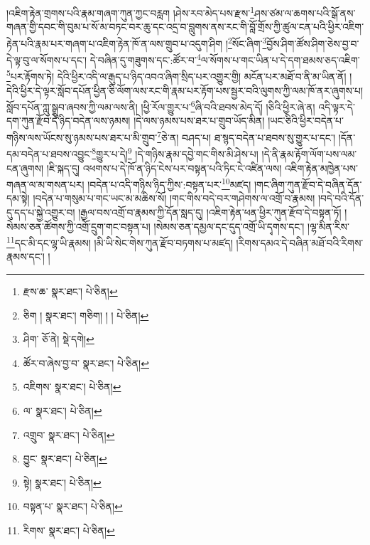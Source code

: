 །འཇིག་རྟེན་གྲགས་པའི་རྣམ་གཞག་ཀུན་ཀྱང་བརླག །ཤེས་རབ་མེད་པས་རྫས་\footnote{རྫས་ཆ་  སྣར་ཐང་།  པེ་ཅིན། }ཤས་ཙམ་ལ་ཆགས་པའི་སྒོ་ནས་གཞན་གྱི་དབང་གི་བུམ་པ་སོ་མ་བཏང་བར་ཆུ་དང་འདྲ་བ་བླུགས་ནས་རང་གི་བློ་གྲོས་ཀྱི་ཚུལ་ངན་པའི་ཕྱིར་འཇིག་རྟེན་པའི་རྣམ་པར་གཞག་པ་འཇིག་རྟེན་ཁོ་ན་ལས་གྲུབ་པ་འདུག་ཤིག །\footnote{ཅིག །  སྣར་ཐང་། གཅིག། ། །  པེ་ཅིན། }སོང་ཞིག་\footnote{ཤིག་  ཅོ་ནེ།  སྡེ་དགེ། }བྱོས་ཤིག་ཚོས་ཤིག་ཅེས་བྱ་བ་དེ་ལྟ་བུ་ལ་སོགས་པ་དང་། དེ་བཞིན་དུ་གཟུགས་དང་:ཚོར་བ་\footnote{ཚོར་བ་ཞེས་བྱ་བ་  སྣར་ཐང་།  པེ་ཅིན། }ལ་སོགས་པ་གང་ཡིན་པ་དེ་དག་ཐམས་ཅད་འཇིག་\footnote{འཇིགས་  སྣར་ཐང་།  པེ་ཅིན། }པར་རྟོགས་ཏེ། དེའི་ཕྱིར་འདི་ལ་རྒུད་པ་ཉིད་འབའ་ཞིག་སྲིད་པར་འགྱུར་གྱི། མངོན་པར་མཐོ་བ་ནི་མ་ཡིན་ནོ། །དེའི་ཕྱིར་དེ་ལྟར་སློབ་དཔོན་ཕྱིན་ཅི་ལོག་ལས་རང་གི་རྣམ་པར་རྟོག་པས་སྦྱར་བའི་ལུགས་ཀྱི་ལམ་ཁོ་ནར་ཞུགས་པ། སློབ་དཔོན་ཀླུ་སྒྲུབ་ཞབས་ཀྱི་ལམ་ལས་ནི། །ཕྱི་རོལ་གྱུར་པ་\footnote{ལ་  སྣར་ཐང་།  པེ་ཅིན། }ཞི་བའི་ཐབས་མེད་དོ། །ཅིའི་ཕྱིར་ཞེ་ན། འདི་ལྟར་དེ་དག་ཀུན་རྫོབ་དེ་ཉིད་བདེན་ལས་ཉམས། །དེ་ལས་ཉམས་པས་ཐར་པ་གྲུབ་ཡོད་མིན། །ཡང་ཅིའི་ཕྱིར་བདེན་པ་གཉིས་ལས་ཡོངས་སུ་ཉམས་པས་ཐར་པ་མི་གྲུབ་\footnote{འགྲུབ་  སྣར་ཐང་།  པེ་ཅིན། }ཅེ་ན། བཤད་པ། ཐ་སྙད་བདེན་པ་ཐབས་སུ་གྱུར་པ་དང་། །དོན་དམ་བདེན་པ་ཐབས་འབྱུང་\footnote{བྱུང་  སྣར་ཐང་།  པེ་ཅིན། }གྱུར་པ་དེ།\footnote{སྟེ།  སྣར་ཐང་།  པེ་ཅིན། } །དེ་གཉིས་རྣམ་དབྱེ་གང་གིས་མི་ཤེས་པ། །དེ་ནི་རྣམ་རྟོག་ལོག་པས་ལམ་ངན་ཞུགས། །ཇི་སྐད་དུ། འཕགས་པ་དེ་ཁོ་ན་ཉིད་ངེས་པར་བསྟན་པའི་ཏིང་ངེ་འཛིན་ལས། འཇིག་རྟེན་མཁྱེན་པས་གཞན་ལ་མ་གསན་པར། །བདེན་པ་འདི་གཉིས་ཉིད་ཀྱིས་:བསྟན་པར་\footnote{བསྟན་པ་  སྣར་ཐང་།  པེ་ཅིན། }མཛད། །གང་ཞིག་ཀུན་རྫོབ་དེ་བཞིན་དོན་དམ་སྟེ། །བདེན་པ་གསུམ་པ་གང་ཡང་མ་མཆིས་སོ། །གང་གིས་བདེ་བར་གཤེགས་ལ་འགྲོ་བ་རྣམས། །བདེ་བའི་དོན་དུ་དད་པ་སྐྱེ་འགྱུར་བ། །རྒྱལ་བས་འགྲོ་བ་རྣམས་ཀྱི་དོན་སླད་དུ། །འཇིག་རྟེན་ཕན་ཕྱིར་ཀུན་རྫོབ་དེ་བསྟན་ཏོ། །སེམས་ཅན་ཚོགས་ཀྱི་འགྲོ་དྲུག་གང་བསྟན་པ། །སེམས་ཅན་དམྱལ་དང་དུད་འགྲོ་ཡི་དྭགས་དང་། །ལྷ་མིན་རིས་\footnote{རིགས་  སྣར་ཐང་།  པེ་ཅིན། }དང་མི་དང་ལྷ་ཡི་རྣམས། །མི་ཡི་སེང་གེས་ཀུན་རྫོབ་བཏགས་པ་མཛད། །རིགས་དམའ་དེ་བཞིན་མཐོ་བའི་རིགས་རྣམས་དང་། །
